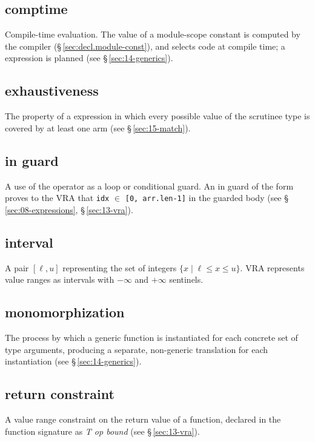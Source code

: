 \subsection*{comptime}
Compile-time evaluation.  The value of a module-scope constant is computed by the
compiler (\S\,\ref{sec:decl.module-const}), and  selects code at compile
time; a  expression is planned (see \S\,\ref{sec:14-generics}).

\subsection*{exhaustiveness}
The property of a  expression in which every possible value of
the scrutinee type is covered by at least one arm
(see \S\,\ref{sec:15-match}).

\subsection*{in guard}
A use of the  operator as a loop or conditional guard.  An in
guard of the form  proves to the VRA that
\texttt{idx} $\in$ \texttt{[0, arr.len-1]} in the guarded body
(see \S\,\ref{sec:08-expressions}, \S\,\ref{sec:13-vra}).

\subsection*{interval}
A pair $[\ell, u]$ representing the set of integers $\{x \mid \ell \leq x
\leq u\}$.  VRA represents value ranges as intervals with $-\infty$ and
$+\infty$ sentinels.

\subsection*{monomorphization}
The process by which a generic function is instantiated for each concrete
set of type arguments, producing a separate, non-generic translation for
each instantiation (see \S\,\ref{sec:14-generics}).

\subsection*{return constraint}
A value range constraint on the return value of a function, declared in the
function signature as \textit{T op bound}
(see \S\,\ref{sec:13-vra}).

